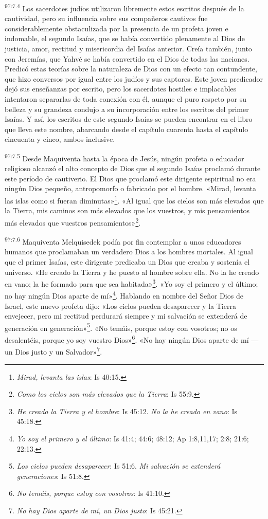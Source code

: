 \par
\textsuperscript{97:7.4} Los sacerdotes judíos utilizaron libremente estos escritos después de la cautividad, pero su influencia sobre sus compañeros cautivos fue considerablemente obstaculizada por la presencia de un profeta joven e indomable, el segundo Isaías, que se había convertido plenamente al Dios de justicia, amor, rectitud y misericordia del Isaías anterior. Creía también, junto con Jeremías, que Yahvé se había convertido en el Dios de todas las naciones. Predicó estas teorías sobre la naturaleza de Dios con un efecto tan contundente, que hizo conversos por igual entre los judíos y sus captores. Este joven predicador dejó sus enseñanzas por escrito, pero los sacerdotes hostiles e implacables intentaron separarlas de toda conexión con él, aunque el puro respeto por su belleza y su grandeza condujo a su incorporación entre los escritos del primer Isaías. Y así, los escritos de este segundo Isaías se pueden encontrar en el libro que lleva este nombre, abarcando desde el capítulo cuarenta hasta el capítulo cincuenta y cinco, ambos inclusive.

\par
\textsuperscript{97:7.5} Desde Maquiventa hasta la época de Jesús, ningún profeta o educador religioso alcanzó el alto concepto de Dios que el segundo Isaías proclamó durante este período de cautiverio. El Dios que proclamó este dirigente espiritual no era ningún Dios pequeño, antropomorfo o fabricado por el hombre. «Mirad, levanta las islas como si fueran diminutas»\footnote{\textit{Mirad, levanta las islas}: Is 40:15.}. «Al igual que los cielos son más elevados que la Tierra, mis caminos son más elevados que los vuestros, y mis pensamientos más elevados que vuestros pensamientos»\footnote{\textit{Como los cielos son más elevados que la Tierra}: Is 55:9.}.

\par
\textsuperscript{97:7.6} Maquiventa Melquisedek podía por fin contemplar a unos educadores humanos que proclamaban un verdadero Dios a los hombres mortales. Al igual que el primer Isaías, este dirigente predicaba un Dios que creaba y sostenía el universo. «He creado la Tierra y he puesto al hombre sobre ella. No la he creado en vano; la he formado para que sea habitada»\footnote{\textit{He creado la Tierra y el hombre}: Is 45:12. \textit{No la he creado en vano}: Is 45:18.}. «Yo soy el primero y el último; no hay ningún Dios aparte de mí»\footnote{\textit{Yo soy el primero y el último}: Is 41:4; 44:6; 48:12; Ap 1:8,11,17; 2:8; 21:6; 22:13.}. Hablando en nombre del Señor Dios de Israel, este nuevo profeta dijo: «Los cielos pueden desaparecer y la Tierra envejecer, pero mi rectitud perdurará siempre y mi salvación se extenderá de generación en generación»\footnote{\textit{Los cielos pueden desaparecer}: Is 51:6. \textit{Mi salvación se extenderá generaciones}: Is 51:8.}. «No temáis, porque estoy con vosotros; no os desalentéis, porque yo soy vuestro Dios»\footnote{\textit{No temáis, porque estoy con vosotros}: Is 41:10.}. «No hay ningún Dios aparte de mí ---un Dios justo y un Salvador»\footnote{\textit{No hay Dios aparte de mí, un Dios justo}: Is 45:21.}.

